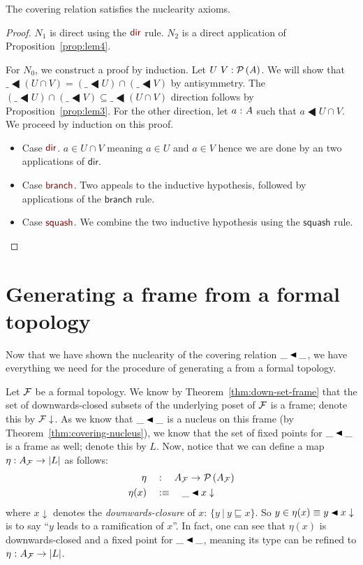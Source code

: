 \begin{thm}\label{thm:covering-nucleus}
  The covering relation satisfies the nuclearity axioms.
\end{thm}
\begin{proof}
  $N_1$ is direct using the $\ruledir{}$ rule. $N_2$ is a direct application of
  Proposition~\ref{prop:lem4}.

  For $N_0$, we construct a proof by induction. Let $U~V:\mathcal{P}\left(A\right)$. We will show
  that $\_ \LHD (U \cap V) = (\_ \LHD U) \cap (\_ \LHD V)$ by antisymmetry. The $(\_ \LHD U) \cap
  (\_ \LHD V) \subseteq \_ \LHD (U \cap V)$ direction follows by Proposition~\ref{prop:lem3}. For the
  other direction, let $a\hspace{0.1mm}:\hspace{0.1mm}A$ such that $a \LHD U \cap V$. We proceed by induction on
  this proof.
  \begin{itemize}
    \item Case $\ruledir{}$. $a \in U \cap V$ meaning $a \in U$ and $a \in V$ hence we are done
      by an two applications of $\mathsf{dir}$.
    \item Case $\rulebranch{}$. Two appeals to the inductive hypothesis, followed by
      applications of the $\mathsf{branch}$ rule.
    \item Case $\rulesquash{}$. We combine the two inductive hypothesis using the
      $\mathsf{squash}$ rule.
  \end{itemize}
\end{proof}

\section{Generating a frame from a formal topology}

Now that we have shown the nuclearity of the covering relation $\covers{\_}{\_}$, we have
everything we need for the procedure of generating a \verframe{} from a formal topology.

Let $\mathcal{F}{}$ be a formal topology. We know by Theorem~\ref{thm:down-set-frame} that the
set of downwards-closed subsets of the underlying poset of $\mathcal{F}{}$ is a frame; denote
this by $\mathcal{F}{}\downarrow$. As we know that $\covers{\_}{\_}$ is a nucleus on this frame (by
Theorem~\ref{thm:covering-nucleus}), we know that the set of fixed points for
$\covers{\_}{\_}$ is a frame as well; denote this by $L$. Now, notice that we can define
a map $\eta : A_{\mathcal{F}{}} \rightarrow \left| L \right|$ as follows:
\begin{align*}
  \eta    \quad&:\quad A_{\McF{}} \rightarrow \pow{A_{\McF{}}}\\
  \eta(x) \quad&\is\quad \covers{\_}{x\downarrow}
\end{align*}
where $x\downarrow$ denotes the \emph{downwards-closure} of $x$: $\{ y~|~y \sqsubseteq x \}$. So $y \in \eta(x) \equiv
\covers{y}{x\downarrow}$ is to say ``$y$ leads to a ramification of $x$''. In fact, one can see
that $\eta(x)$ is downwards-closed and a fixed point for $\covers{\_}{\_}$, meaning its type
can be refined to $\eta\hspace{0.1mm}:\hspace{0.1mm}A_{\mathcal{F}{}} \rightarrow \left| L \right|$.

